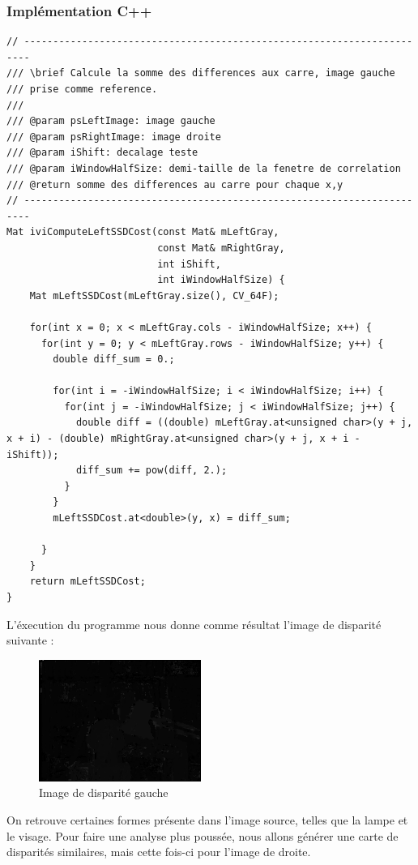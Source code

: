 \documentclass[a4paper]{article}
\begin{document}
\subsubsection{Implémentation C++}
\begin{lstlisting}
// -----------------------------------------------------------------------
/// \brief Calcule la somme des differences aux carre, image gauche
/// prise comme reference.
///
/// @param psLeftImage: image gauche
/// @param psRightImage: image droite
/// @param iShift: decalage teste
/// @param iWindowHalfSize: demi-taille de la fenetre de correlation
/// @return somme des differences au carre pour chaque x,y
// -----------------------------------------------------------------------
Mat iviComputeLeftSSDCost(const Mat& mLeftGray,
                          const Mat& mRightGray,
                          int iShift,
                          int iWindowHalfSize) {
    Mat mLeftSSDCost(mLeftGray.size(), CV_64F);

    for(int x = 0; x < mLeftGray.cols - iWindowHalfSize; x++) {
      for(int y = 0; y < mLeftGray.rows - iWindowHalfSize; y++) {
        double diff_sum = 0.;

        for(int i = -iWindowHalfSize; i < iWindowHalfSize; i++) {
          for(int j = -iWindowHalfSize; j < iWindowHalfSize; j++) {
            double diff = ((double) mLeftGray.at<unsigned char>(y + j, x + i) - (double) mRightGray.at<unsigned char>(y + j, x + i - iShift));
            diff_sum += pow(diff, 2.);
          }
        }
        mLeftSSDCost.at<double>(y, x) = diff_sum;

      }
    }
    return mLeftSSDCost;
}
\end{lstlisting}

L'éxecution du programme nous donne comme résultat l'image de disparité suivante :
\begin{figure}[h]
\begin{center}
	\includegraphics[width=200px]{left-disparity.png}
\end{center}
\caption{Image de disparité gauche}
\end{figure}
On retrouve certaines formes présente dans l'image source, telles que la lampe et le visage. Pour faire une analyse plus poussée, nous allons générer une carte de disparités similaires, mais cette fois-ci pour l'image de droite.
\end{document}
